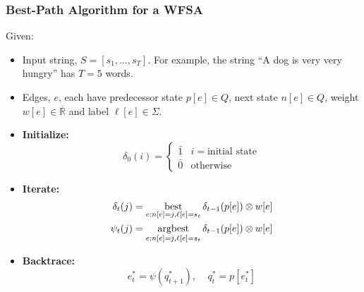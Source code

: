 \documentclass{beamer}
\newcommand{\best}{\operatornamewithlimits{best}}
\newcommand{\argbest}{\operatornamewithlimits{argbest}}
\begin{document}
\begin{frame}
  \frametitle{Best-Path Algorithm for a WFSA}

  Given:
  \begin{itemize}
  \item Input string, $S=[s_1,\ldots,s_T]$.  For example, the
    string ``A dog is very very hungry'' has $T=5$ words.
  \item Edges, $e$, each have predecessor state $p[e]\in Q$, next state
    $n[e]\in Q$, weight $w[e]\in\overline{\mathbb{R}}$ and label $\ell[e]\in\Sigma$.
  \end{itemize}
  \begin{itemize}
  \item {\bf Initialize:}
    \begin{displaymath}
      \delta_0(i) = \begin{cases}
        \bar{1} & i=\mbox{initial state}\\
        \bar{0} & \mbox{otherwise}
      \end{cases}
    \end{displaymath}
  \item {\bf Iterate:}
    \begin{align*}
      \delta_t(j) &= \best_{e:n[e]=j,\ell[e]=s_t} \delta_{t-1}(p[e]) \otimes w[e]\\
      \psi_t(j) &= \argbest_{e:n[e]=j,\ell[e]=s_t} \delta_{t-1}(p[e]) \otimes w[e]
    \end{align*}
  \item {\bf Backtrace:}
    \begin{displaymath}
      e^*_t = \psi(q^*_{t+1}),~~~~~q^*_t=p[e^*_t]
    \end{displaymath}
  \end{itemize}
\end{frame}
\end{document}
